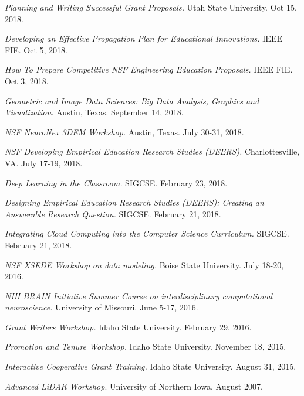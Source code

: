 \documentclass[margin,line]{res}
\begin{document}
\begin{resume}
\textit{Planning and Writing Successful Grant Proposals.} Utah State University. Oct 15, 2018.

\textit{Developing an Effective Propagation Plan for Educational Innovations.} IEEE FIE. Oct 5, 2018.

\textit{How To Prepare Competitive NSF Engineering Education Proposals.} IEEE FIE. Oct 3, 2018.

\textit{Geometric and Image Data Sciences: Big Data Analysis, Graphics and Visualization.} Austin, Texas. September 14, 2018.

\textit{NSF NeuroNex 3DEM Workshop.} Austin, Texas. July 30-31, 2018.

\textit{NSF Developing Empirical Education Research Studies (DEERS).} Charlottesville, VA. July 17-19, 2018.

\textit{Deep Learning in the Classroom.} SIGCSE. February 23, 2018.

\textit{Designing Empirical Education Research Studies (DEERS): Creating an Answerable Research Question.} SIGCSE. February 21, 2018.

\textit{Integrating Cloud Computing into the Computer Science Curriculum.} SIGCSE. February 21, 2018.

\textit{NSF XSEDE Workshop on data modeling.} Boise State University. July 18-20, 2016.

\textit{NIH BRAIN Initiative Summer Course on interdisciplinary computational neuroscience.} University of Missouri. June 5-17, 2016.

\textit{Grant Writers Workshop.} Idaho State University. February 29, 2016.

\textit{Promotion and Tenure Workshop.} Idaho State University. November 18, 2015.

\textit{Interactive Cooperative Grant Training.} Idaho State University. August 31, 2015.

\textit{Advanced LiDAR Workshop}. University of Northern Iowa. August 2007.


\end{resume}
\end{document}
